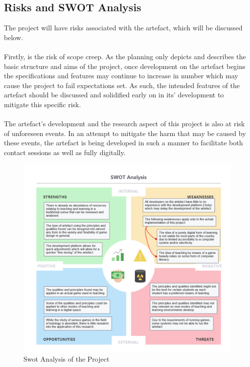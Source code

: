 \subsection{Risks and SWOT Analysis}
The project will have risks associated with the artefact, which will be discussed below.
\\\\
Firstly, is the risk of scope creep. As the planning only depicts and describes the basic structure and aims of the project, once development on the artefact begins the specifications and features may continue to increase in number which may cause the project to fail expectations set. As such, the intended features of the artefact should be discussed and solidified early on in its’ development to mitigate this specific risk.
\\\\
The artefact's development and the research aspect of this project is also at risk of unforeseen events. In an attempt to mitigate the harm that may be caused by these events, the artefact is being developed in such a manner to facilitate both contact sessions as well as fully digitally.

\begin{figure}[H]
\centering
\includegraphics[scale=1.75]{Figures/swot}
\caption{Swot Analysis of the Project}
\end{figure}

